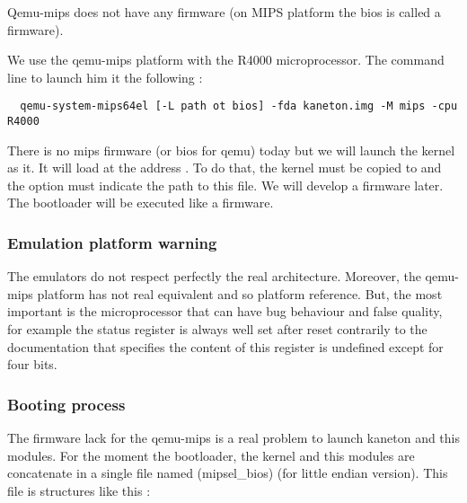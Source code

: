 Qemu-mips does not have any firmware (on MIPS platform the bios is called a firmware).

We use the qemu-mips platform with the R4000 microprocessor. The command line to launch him it the following :

\begin{verbatim}
  qemu-system-mips64el [-L path ot bios] -fda kaneton.img -M mips -cpu R4000
\end{verbatim}

There is no mips firmware (or bios for qemu) today but we will launch the kernel as it. It will load at the address . To do that, the kernel must be copied to  and the  option must indicate the path to this file. We will develop a firmware later.
The bootloader will be executed like a firmware.

\subsubsection{Emulation platform warning}

The emulators do not respect perfectly the real architecture. Moreover, the qemu-mips platform has not
real equivalent and so platform reference. But, the most important is the microprocessor that can have bug behaviour
and false quality, for example the status register is always well set after reset contrarily to the documentation that specifies the content of this register
is undefined except for four bits.

\subsubsection{Booting process}

The firmware lack for the qemu-mips is a real problem to launch kaneton and this modules.
For the moment the bootloader, the kernel and this modules are concatenate in a single file
named \location(mipsel\_bios) (for little endian version). This file is structures like this :
